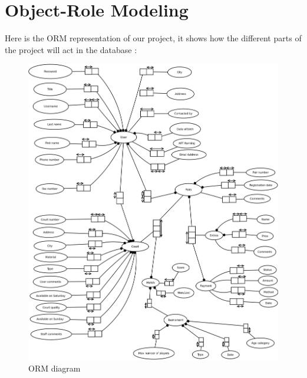 \section{Object-Role Modeling}

Here is the ORM representation of our project, it shows how the different
parts of the project will act in the database :

\begin{figure}[!ht]
    \centering
    \includegraphics[width=\linewidth]{ORM.png}
    \caption{ORM diagram}
\end{figure}
\FloatBarrier
